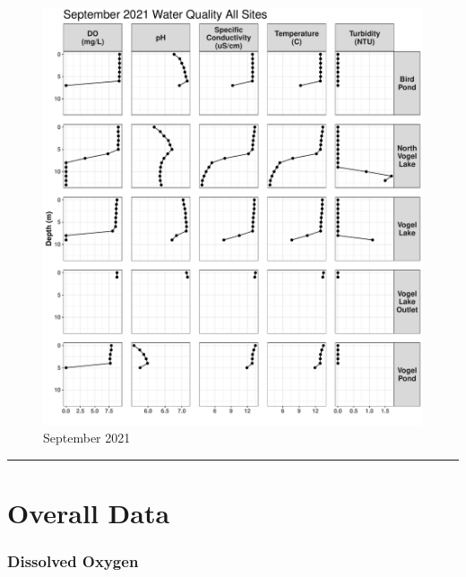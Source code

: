 \documentclass[
]{book}
\begin{document}
\begin{figure}
\centering
\includegraphics{Miller_Creek_Vogel_Lake_Water_Quality_files/figure-latex/unnamed-chunk-9-1.pdf}
\caption{\label{fig:unnamed-chunk-9}September 2021}
\end{figure}

\begin{center}\rule{0.5\linewidth}{0.5pt}\end{center}

\hypertarget{overall-data}{%
\section{Overall Data}\label{overall-data}}

\hypertarget{dissolved-oxygen}{%
\subsubsection{Dissolved Oxygen}\label{dissolved-oxygen}}
\end{document}
